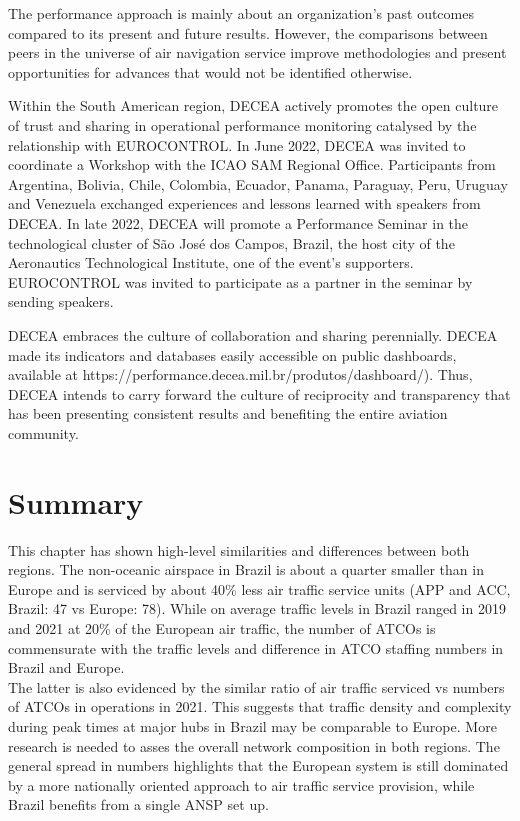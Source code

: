 \documentclass[
  a4paper,
  DIV=11,
  numbers=noendperiod]{scrreprt}
\begin{document}
The performance approach is mainly about an organization's past outcomes
compared to its present and future results. However, the comparisons
between peers in the universe of air navigation service improve
methodologies and present opportunities for advances that would not be
identified otherwise.

Within the South American region, DECEA actively promotes the open
culture of trust and sharing in operational performance monitoring
catalysed by the relationship with EUROCONTROL. In June 2022, DECEA was
invited to coordinate a Workshop with the ICAO SAM Regional Office.
Participants from Argentina, Bolivia, Chile, Colombia, Ecuador, Panama,
Paraguay, Peru, Uruguay and Venezuela exchanged experiences and lessons
learned with speakers from DECEA. In late 2022, DECEA will promote a
Performance Seminar in the technological cluster of São José dos Campos,
Brazil, the host city of the Aeronautics Technological Institute, one of
the event's supporters. EUROCONTROL was invited to participate as a
partner in the seminar by sending speakers.

DECEA embraces the culture of collaboration and sharing perennially.
DECEA made its indicators and databases easily accessible on public
dashboards, available at
https://performance.decea.mil.br/produtos/dashboard/). Thus, DECEA
intends to carry forward the culture of reciprocity and transparency
that has been presenting consistent results and benefiting the entire
aviation community.

\hypertarget{summary}{%
\section{Summary}\label{summary}}

This chapter has shown high-level similarities and differences between
both regions. The non-oceanic airspace in Brazil is about a quarter
smaller than in Europe and is serviced by about 40\% less air traffic
service units (APP and ACC, Brazil: 47 vs Europe: 78). While on average
traffic levels in Brazil ranged in 2019 and 2021 at 20\% of the European
air traffic, the number of ATCOs is commensurate with the traffic levels
and difference in ATCO staffing numbers in Brazil and Europe.\\
The latter is also evidenced by the similar ratio of air traffic
serviced vs numbers of ATCOs in operations in 2021. This suggests that
traffic density and complexity during peak times at major hubs in Brazil
may be comparable to Europe. More research is needed to asses the
overall network composition in both regions. The general spread in
numbers highlights that the European system is still dominated by a more
nationally oriented approach to air traffic service provision, while
Brazil benefits from a single ANSP set up.
\end{document}
